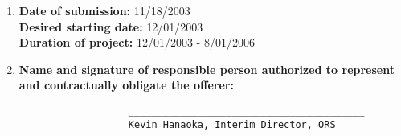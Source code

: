 \begin{enumerate}
\item {\bf Date of submission: } 11/18/2003 \\
      {\bf Desired starting date: } 12/01/2003 \\
      {\bf Duration of project: } 12/01/2003 - 8/01/2006

\item {\bf Name and signature of responsible person authorized to represent
and contractually obligate the offerer: } \\

\begin{verbatim}
                   _________________________________________
                   Kevin Hanaoka, Interim Director, ORS
\end{verbatim}

\end{enumerate}

